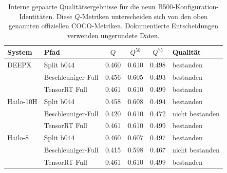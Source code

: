 \begin{table}[htbp]
\centering\small\TableSetup
\caption{Interne gepaarte Qualitätsergebnisse für die neun B500-Konfiguration-Identitäten. Diese $Q$-Metriken unterscheiden sich von den oben genannten offiziellen COCO-Metriken. Dokumentierte Entscheidungen verwenden ungerundete Daten.}
\label{tab:evaluation:yolov7_standard_quality}
\begin{tabularx}{\linewidth}{@{}L{1.55cm}Y S[table-format=1.3] S[table-format=1.3] S[table-format=1.3]l@{}}
\toprule
\textbf{System} & \textbf{Pfad} & {$Q$} & {$Q^{50}$} & {$Q^{75}$} & \textbf{Qualität} \\
\midrule
DEEPX & Split b044 & 0.460 & 0.610 & 0.498 & bestanden \\
 & Beschleuniger-Full & 0.456 & 0.605 & 0.493 & bestanden \\
 & TensorRT Full & 0.461 & 0.610 & 0.499 & bestanden \\
\addlinespace[.3em]
Hailo-10H & Split b044 & 0.458 & 0.608 & 0.494 & bestanden \\
 & Beschleuniger-Full & 0.420 & 0.610 & 0.472 & nicht bestanden \\
 & TensorRT Full & 0.461 & 0.610 & 0.499 & bestanden \\
\addlinespace[.3em]
Hailo-8 & Split b044 & 0.460 & 0.607 & 0.497 & bestanden \\
 & Beschleuniger-Full & 0.415 & 0.598 & 0.467 & nicht bestanden \\
 & TensorRT Full & 0.461 & 0.610 & 0.499 & bestanden \\
\bottomrule
\end{tabularx}
\end{table}
